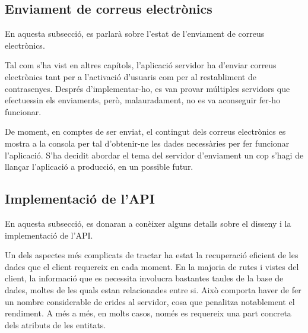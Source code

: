 \documentclass[a4paper,12pt]{ThesisStyle}
\begin{document}
\subsection{Enviament de correus electrònics}
\label{subsec:enviament_correus}

En aquesta subsecció, es parlarà sobre l'estat de l'enviament de correus electrònics.

Tal com s'ha vist en altres capítols, l'aplicació servidor ha d'enviar correus electrònics tant per a l'activació d'usuaris com per al restabliment de contrasenyes. Després d'implementar-ho, es van provar múltiples servidors que efectuessin els enviaments, però, malauradament, no es va aconseguir fer-ho funcionar.

De moment, en comptes de ser enviat, el contingut dels correus electrònics es mostra a la consola per tal d'obtenir-ne les dades necessàries per fer funcionar l'aplicació. S'ha decidit abordar el tema del servidor d'enviament un cop s'hagi de llançar l'aplicació a producció, en un possible futur.

\subsection{Implementació de l'API}
\label{subsec:api}

En aquesta subsecció, es donaran a conèixer alguns detalls sobre el disseny i la implementació de l'API.

Un dels aspectes més complicats de tractar ha estat la recuperació eficient de les dades que el client requereix en cada moment. En la majoria de rutes i vistes del client, la informació que es necessita involucra bastantes taules de la base de dades, moltes de les quals estan relacionades entre si. Això comporta haver de fer un nombre considerable de crides al servidor, cosa que penalitza notablement el rendiment. A més a més, en molts casos, només es requereix una part concreta dels atributs de les entitats. 
\end{document}
